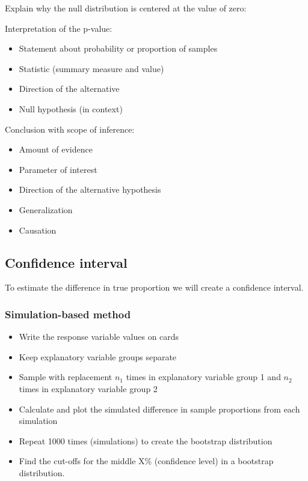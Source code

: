 \documentclass[
]{report}
\begin{document}
Explain why the null distribution is centered at the value of zero:

\vspace{1in}

Interpretation of the p-value:

\begin{itemize}
\item
  Statement about probability or proportion of samples
\item
  Statistic (summary measure and value)
\item
  Direction of the alternative
\item
  Null hypothesis (in context)
\end{itemize}

\vspace{0.8in}

\newpage

Conclusion with scope of inference:

\begin{itemize}
\item
  Amount of evidence
\item
  Parameter of interest
\item
  Direction of the alternative hypothesis
\item
  Generalization
\item
  Causation
\end{itemize}

\vspace{0.8in}

\hypertarget{confidence-interval-2}{%
\subsection*{Confidence interval}\label{confidence-interval-2}}

To estimate the difference in true proportion we will create a confidence interval.

\hypertarget{simulation-based-method-3}{%
\subsubsection*{Simulation-based method}\label{simulation-based-method-3}}

\begin{itemize}
\item
  Write the response variable values on cards
\item
  Keep explanatory variable groups separate
\item
  Sample with replacement \(n_1\) times in explanatory variable group 1 and \(n_2\) times in explanatory variable group 2
\item
  Calculate and plot the simulated difference in sample proportions from each simulation
\item
  Repeat 1000 times (simulations) to create the bootstrap distribution
\item
  Find the cut-offs for the middle X\% (confidence level) in a bootstrap distribution.
\end{itemize}
\end{document}
